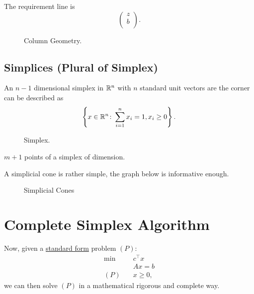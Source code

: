 The requirement line is
\[
	\begin{pmatrix}
		z \\
		b \\
	\end{pmatrix}.
\]

\begin{figure}[H]
	\centering
	\caption{Column Geometry.}
	\label{fig:column-geometry}
\end{figure}

\subsection{Simplices (Plural of Simplex)}
\begin{eg}[Simplex]
	An \(n-1\) dimensional simplex in \(\mathbb{\MakeUppercase{R}}^n\) with \(n\) standard unit vectors are the corner can be described as
	\[
		\left\{x\in \mathbb{\MakeUppercase{R}}^n \colon \sum\limits_{i=1}^{n} x_i = 1, x_i \geq 0\right\}.
	\]
	\begin{figure}[H]
		\centering
		\caption{Simplex.}
		\label{fig:simplex}
	\end{figure}
\end{eg}

\begin{note}
	\(m+1\) points of a simplex of dimension.
\end{note}

A simplicial cone is rather simple, the graph below is informative enough.
\begin{figure}[H]
	\centering
	\caption{Simplicial Cones}
	\label{fig:simplicial-cones}
\end{figure}

\section{Complete Simplex Algorithm}
Now, given a \hyperref[def:standard-form]{standard form} problem \((P)\):
\begin{align*}
	\min~    & c^{\top}x \\
	         & Ax = b    \\
	(P)\quad & x\geq 0,
\end{align*}
we can then solve \((P)\) in a mathematical rigorous and complete way.

